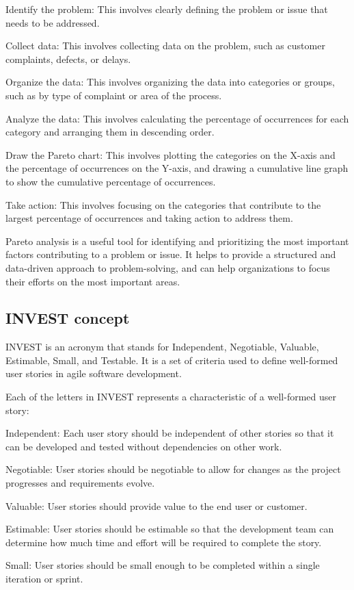 \documentclass[12pt, a4paper, oneside]{article}
\begin{document}
Identify the problem: This involves clearly defining the problem or issue that needs to be addressed.

Collect data: This involves collecting data on the problem, such as customer complaints, defects, or delays.

Organize the data: This involves organizing the data into categories or groups, such as by type of complaint or area of the process.

Analyze the data: This involves calculating the percentage of occurrences for each category and arranging them in descending order.

Draw the Pareto chart: This involves plotting the categories on the X-axis and the percentage of occurrences on the Y-axis, and drawing a cumulative line graph to show the cumulative percentage of occurrences.

Take action: This involves focusing on the categories that contribute to the largest percentage of occurrences and taking action to address them.

Pareto analysis is a useful tool for identifying and prioritizing the most important factors contributing to a problem or issue. It helps to provide a structured and data-driven approach to problem-solving, and can help organizations to focus their efforts on the most important areas.
\subsection{ INVEST concept }
INVEST is an acronym that stands for Independent, Negotiable, Valuable, Estimable, Small, and Testable. It is a set of criteria used to define well-formed user stories in agile software development.

Each of the letters in INVEST represents a characteristic of a well-formed user story:

Independent: Each user story should be independent of other stories so that it can be developed and tested without dependencies on other work.

Negotiable: User stories should be negotiable to allow for changes as the project progresses and requirements evolve.

Valuable: User stories should provide value to the end user or customer.

Estimable: User stories should be estimable so that the development team can determine how much time and effort will be required to complete the story.

Small: User stories should be small enough to be completed within a single iteration or sprint.
\end{document}
